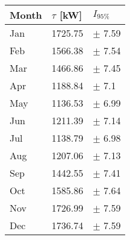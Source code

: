 \begin{tabular}{lll}
\toprule
Month & $\tau$ [kW] &   $I_{95\%}$ \\
\midrule
  Jan &     1725.75 &   $\pm$ 7.59 \\
  Feb &     1566.38 &   $\pm$ 7.54 \\
  Mar &     1466.86 &   $\pm$ 7.45 \\
  Apr &     1188.84 &    $\pm$ 7.1 \\
  May &     1136.53 &   $\pm$ 6.99 \\
  Jun &     1211.39 &   $\pm$ 7.14 \\
  Jul &     1138.79 &   $\pm$ 6.98 \\
  Aug &     1207.06 &   $\pm$ 7.13 \\
  Sep &     1442.55 &   $\pm$ 7.41 \\
  Oct &     1585.86 &   $\pm$ 7.64 \\
  Nov &     1726.99 &   $\pm$ 7.59 \\
  Dec &     1736.74 &   $\pm$ 7.59 \\
\bottomrule
\end{tabular}
